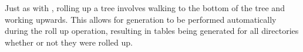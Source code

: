 \subsubsection{\gufirollup}
Just as with \gufitreesummaryall, rolling up a tree involves walking
to the bottom of the tree and working upwards. This allows for
\treesummary generation to be performed automatically during the roll
up operation, resulting in \treesummary tables being generated for all
directories whether or not they were rolled up.
